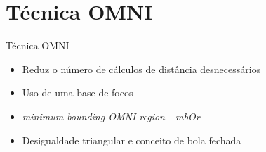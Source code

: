 \documentclass{beamer}
\begin{document}
\section{Técnica OMNI}

\begin{frame}{Técnica OMNI}

  \begin{itemize}
   \item Reduz o número de cálculos de distância desnecessários\newline
   
   \item Uso de uma base de focos\newline
   
   \item \textit{minimum bounding OMNI region - mbOr}\newline
   
   \item Desigualdade triangular e conceito de bola fechada

  \end{itemize}

 
\end{frame}
\end{document}
